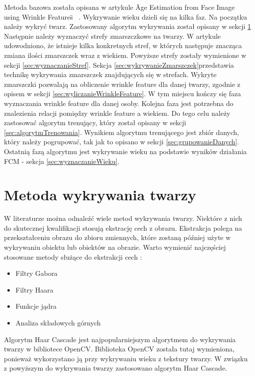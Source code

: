 \documentclass[a4paper,twoside,12pt]{book}
\begin{document}
    Metoda bazowa została opisana w artykule \"Age Estimation from Face Image using Wrinkle Features\"
    ~\cite{wrinkleFeatures}.
    Wykrywanie wieku dzieli się na kilka faz. Na początku należy wykryć twarz. Zastosowany algorytm wykrywania został
    opisany w sekcji \ref{sec:metodaWykrywaniaTwarzy}
    Następnie należy wyznaczyć strefy zmarszczkowe na twarzy. W artykule \cite{wrinkleFeatures} udowodniono,
    że istnieje kilka konkretnych stref, w których następuje znacząca zmiana ilości zmarszczek wraz z wiekiem.
    Powyższe strefy zostały wymienione w sekcji \ref{sec:wyznaczanieStref}. Sekcja
    \ref{sec:wykrywanieZmarszczek}przedstawia technikę wykrywania zmarszczek znajdujących się w strefach. Wykryte zmarszczki
    pozwalają na obliczenie wrinkle feature dla danej twarzy, zgodnie z opisem w sekcji \ref{sec:wyliczanieWrinkleFeature}.
    W tym miejscu kończy się faza wyznaczania wrinkle feature dla danej osoby. Kolejna faza jest potrzebna do
    znalezienia relacji pomiędzy wrinkle feature a wiekiem. Do tego celu należy zastosować algorytm trenujący, który
    został opisany w sekcji \ref{sec:algorytmTrenowania}. Wynikiem algorytmu trenującego jest zbiór danych, który
    należy pogrupować, tak jak to opisano w sekcji \ref{sec:grupowanieDanych}. Ostatnią fazą algorytmu jest wykrywanie wieku
    na podstawie wyników działania FCM - sekcja \ref{sec:wyznaczanieWieku}.


    \section{Metoda wykrywania twarzy}\label{sec:metodaWykrywaniaTwarzy}
    W literaturze można odnaleźć wiele metod wykrywania twarzy. Niektóre z nich do skutecznej kwalifikacji
    stosują ekstrację cech z obrazu. Ekstrakcja polega na przekształceniu obrazu do zbioru zmiennych, które
    zostaną później użyte w wykrywaniu obiektu lub obiektów na obrazie. Warto wymienić
    najczęściej stosowane metody służące do ekstrakcji cech \cite{computerVision}:
    \begin{itemize}
        \item Filtry Gabora
        \item Filtry Haara
        \item Funkcje jądra
        \item Analiza składowych górnych
    \end{itemize}
    Algorytm Haar Cascade jest najpopularniejszym algorytmem do wykrywania twarzy w bibliotece OpenCV. Biblioteka OpenCV
    została tutaj wymieniona, ponieważ wykorzystano ją przy wykrywaniu wieku z tekstury twarzy. W związku z powyższym
    do wykrywania twarzy zastosowano algorytm Haar Cascade.
\end{document}
